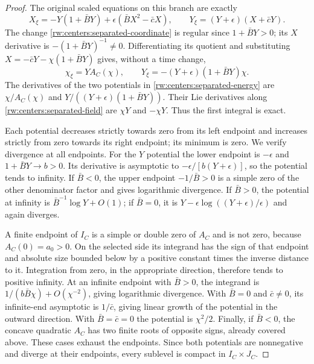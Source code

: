 \begin{proof}
The original scaled equations on this branch are exactly
\[
 X_\xi=-Y(1+\bar BY)+\epsilon(\bar BX^2-\bar cX),
 \qquad Y_\xi=(Y+\epsilon)(X+\bar cY).
\]
The change \eqref{rw:centers:separated-coordinate} is regular since
$1+\bar BY>0$; its $X$ derivative is
$-(1+\bar BY)^{-1}\ne0$. Differentiating its quotient and substituting
$X=-\bar cY-\chi(1+\bar BY)$ gives, without a time change,
\begin{equation}\label{rw:centers:separated-field}
 \chi_\xi=Y A_C(\chi),\qquad
 Y_\xi=-(Y+\epsilon)(1+\bar BY)\chi.
\end{equation}
The derivatives of the two potentials in
\eqref{rw:centers:separated-energy} are
$\chi/A_C(\chi)$ and $Y/((Y+\epsilon)(1+\bar BY))$.
Their Lie derivatives along \eqref{rw:centers:separated-field}
are $\chi Y$ and $-\chi Y$. Thus the first integral is exact.

Each potential decreases strictly towards zero from its left endpoint
and increases strictly from zero towards its right endpoint; its
minimum is zero. We verify divergence at all endpoints.
For the $Y$ potential the lower endpoint is $-\epsilon$ and
$1+\bar BY\to b>0$. Its derivative is asymptotic to
$-\epsilon/[b(Y+\epsilon)]$, so the potential tends to infinity.
If $\bar B<0$, the upper endpoint $-1/\bar B>0$ is a simple zero
of the other denominator factor and gives logarithmic divergence.
If $\bar B>0$, the potential at infinity is
$\bar B^{-1}\log Y+O(1)$; if $\bar B=0$, it is
$Y-\epsilon\log((Y+\epsilon)/\epsilon)$ and again diverges.

A finite endpoint of $I_C$ is a simple or double zero of $A_C$
and is not zero, because $A_C(0)=a_0>0$.
On the selected side its integrand has the sign of that endpoint
and absolute size bounded below by a positive constant times the
inverse distance to it. Integration from zero, in the appropriate
direction, therefore tends to positive infinity. At an infinite
endpoint with $\bar B>0$, the integrand is
$1/(b\bar B\chi)+O(\chi^{-2})$, giving logarithmic divergence.
With $\bar B=0$ and $\bar c\ne0$, its infinite-end asymptotic is
$1/\bar c$, giving linear growth of the potential in the outward
direction. With $\bar B=\bar c=0$ the potential is $\chi^2/2$.
Finally, if $\bar B<0$, the concave quadratic $A_C$ has two finite
roots of opposite signs, already covered above. These cases exhaust
the endpoints. Since both potentials are nonnegative and diverge at
their endpoints, every sublevel is compact in $I_C\times J_C$.


\end{proof}
